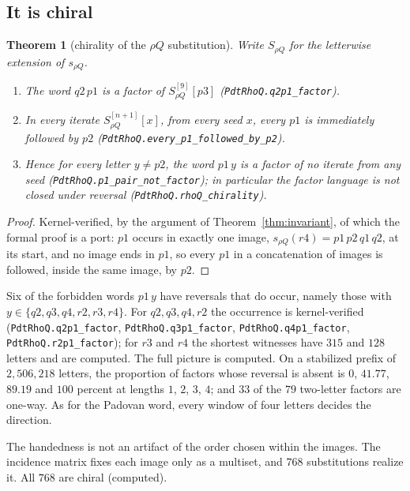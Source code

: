 \documentclass[11pt]{amsart}
\theoremstyle{plain}
\newtheorem{theorem}{Theorem}[section]
\theoremstyle{definition}
\theoremstyle{remark}
\begin{document}
\subsection{It is chiral}

\begin{theorem}[chirality of the $\rho Q$ substitution]\label{thm:rhoQchiral}
Write $S_{\rho Q}$ for the letterwise extension of $s_{\rho Q}$.
\begin{enumerate}
\item[(a)] The word $q2\,p1$ is a factor of $S_{\rho Q}^{[9]}[p3]$
\textup{(\texttt{PdtRhoQ.q2p1\_factor})}.
\item[(b)] In every iterate $S_{\rho Q}^{[n+1]}[x]$, from every seed $x$, every $p1$ is
immediately followed by $p2$ \textup{(\texttt{PdtRhoQ.every\_p1\_followed\_by\_p2})}.
\item[(c)] Hence for every letter $y \ne p2$, the word $p1\,y$ is a factor of no iterate
from any seed \textup{(\texttt{PdtRhoQ.p1\_pair\_not\_factor})}; in particular the factor
language is not closed under reversal \textup{(\texttt{PdtRhoQ.rhoQ\_chirality})}.
\end{enumerate}
\end{theorem}

\begin{proof}
Kernel-verified, by the argument of Theorem~\ref{thm:invariant}, of which the formal proof
is a port: $p1$ occurs in exactly one image, $s_{\rho Q}(r4) = p1\,p2\,q1\,q2$, at its start,
and no image ends in $p1$, so every $p1$ in a concatenation of images is followed, inside the
same image, by $p2$.
\end{proof}

Six of the forbidden words $p1\,y$ have reversals that do occur, namely those with
$y \in \{q2, q3, q4, r2, r3, r4\}$. For $q2, q3, q4, r2$ the occurrence is kernel-verified
(\texttt{PdtRhoQ.q2p1\_factor}, \texttt{PdtRhoQ.q3p1\_factor}, \texttt{PdtRhoQ.q4p1\_factor},
\texttt{PdtRhoQ.r2p1\_factor}); for $r3$ and $r4$ the shortest witnesses have $315$ and $128$
letters and are computed. The full picture is computed. On a stabilized prefix of
$2{,}506{,}218$ letters, the proportion of factors whose reversal is absent is $0$,
$41.77$, $89.19$ and $100$ percent at lengths $1$, $2$, $3$, $4$; and $33$ of the $79$
two-letter factors are one-way. As for the Padovan word, every window of four letters
decides the direction.

The handedness is not an artifact of the order chosen within the images. The incidence
matrix fixes each image only as a multiset, and $768$ substitutions realize it. All $768$ are
chiral (computed).
\end{document}
